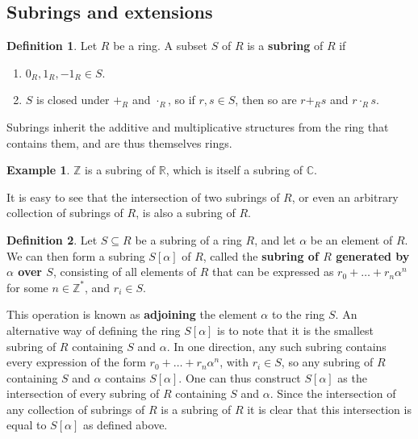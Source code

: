 \documentclass{article}
\newcommand{\Z}{\mathbb{Z}}
\newcommand{\R}{\mathbb{R}}
\newcommand{\C}{\mathbb{C}}
\renewcommand{\sb}[1]{\left[ #1 \right]}
\theoremstyle{definition}\newtheorem{definition}{Definition}[subsection]
\theoremstyle{definition}\newtheorem{remark}[definition]{Remark}
\theoremstyle{definition}\newtheorem*{example}{Example}
\theoremstyle{definition}\newtheorem*{note}{Note}
\begin{document}
\subsection{Subrings and extensions}

\begin{definition}
Let $ R $ be a ring. A subset $ S $ of $ R $ is a \textbf{subring} of $ R $ if
\begin{enumerate}
\item $ 0_R, 1_R, -1_R \in S $.
\item $ S $ is closed under $ +_R $ and $ \cdot_R $, so if $ r, s \in S $, then so are $ r +_R s $ and $ r \cdot_R s $.
\end{enumerate}
\end{definition}

Subrings inherit the additive and multiplicative structures from the ring that contains them, and are thus themselves rings.

\begin{example}
$ \Z $ is a subring of $ \R $, which is itself a subring of $ \C $.
\end{example}

It is easy to see that the intersection of two subrings of $ R $, or even an arbitrary collection of subrings of $ R $, is also a subring of $ R $.

\begin{definition}
Let $ S \subseteq R $ be a subring of a ring $ R $, and let $ \alpha $ be an element of $ R $. We can then form a subring $ S\sb{\alpha} $ of $ R $, called the \textbf{subring of $ R $ generated by $ \alpha $ over $ S $}, consisting of all elements of $ R $ that can be expressed as $ r_0 + \dots + r_n\alpha^n $ for some $ n \in \Z^* $, and $ r_i \in S $.
\end{definition}

This operation is known as \textbf{adjoining} the element $ \alpha $ to the ring $ S $. An alternative way of defining the ring $ S\sb{\alpha} $ is to note that it is the smallest subring of $ R $ containing $ S $ and $ \alpha $. In one direction, any such subring contains every expression of the form $ r_0 + \dots + r_n\alpha^n $, with $ r_i \in S $, so any subring of $ R $ containing $ S $ and $ \alpha $ contains $ S\sb{\alpha} $. One can thus construct $ S\sb{\alpha} $ as the intersection of every subring of $ R $ containing $ S $ and $ \alpha $. Since the intersection of any collection of subrings of $ R $ is a subring of $ R $ it is clear that this intersection is equal to $ S\sb{\alpha} $ as defined above.
\end{document}
